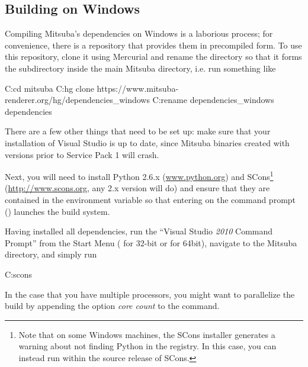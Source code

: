 
\subsection{Building on Windows}
Compiling Mitsuba's dependencies on Windows is a laborious process; for convenience, there
is a repository that provides them in precompiled form. To use this repository, clone it
using Mercurial and rename the directory so that it forms the  subdirectory
inside the main Mitsuba directory, i.e. run something like
\begin{shell}
C:\>cd mitsuba
C:\mitsuba\>hg clone https://www.mitsuba-renderer.org/hg/dependencies_windows
C:\mitsuba\>rename dependencies_windows dependencies
\end{shell}
There are a few other things that need to be set up: make sure that your
installation of Visual Studio is up to date, since Mitsuba binaries created with versions
prior to Service Pack 1 will crash.

Next, you will need to install Python 2.6.x 
(\url{www.python.org}) and SCons\footnote{Note that on some Windows machines, the SCons 
installer generates a warning about not finding Python in the registry. In this case, you 
can instead run  within the source release of SCons.} 
(\url{http://www.scons.org}, any 2.x version will do) and ensure that they are contained in the  
environment variable so that entering  on the command prompt () 
launches the build system.

Having installed all dependencies, run the ``Visual Studio \emph{2010} Command 
Prompt'' from the Start Menu ( for 32-bit or  for 64bit), 
navigate to the Mitsuba directory, and simply run
\begin{shell}
C:\mitsuba\>scons
\end{shell}
In the case that you have multiple processors, you might want to parallelize the build by appending the option \emph{core count} to the  command.

